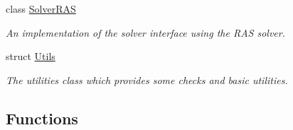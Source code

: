 \begin{DoxyCompactItemize}
class \hyperlink{classSchwarzWrappers_1_1SolverRAS}{Solver\+R\+AS}
\begin{DoxyCompactList}\small\item\em An implementation of the solver interface using the R\+AS solver. \end{DoxyCompactList}\item 
struct \hyperlink{structSchwarzWrappers_1_1Utils}{Utils}
\begin{DoxyCompactList}\small\item\em The utilities class which provides some checks and basic utilities. \end{DoxyCompactList}\end{DoxyCompactItemize}
\subsection*{Functions}

